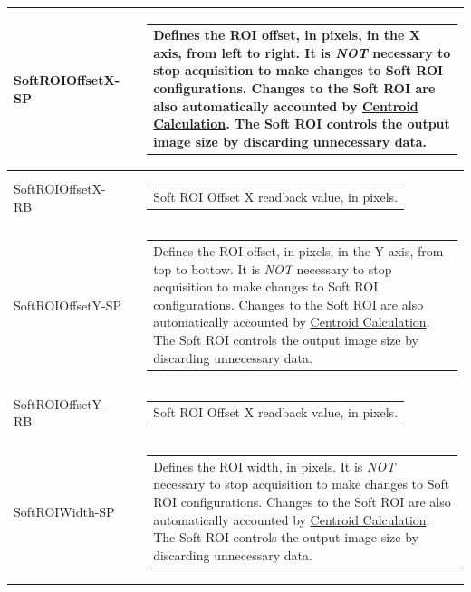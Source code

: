 \documentclass[openany]{article}
\begin{document}
\begin{longtable}{| m{3.0cm} m{4.5cm} m{7.0cm} |}
        SoftROIOffsetX-SP &  & \begin{tabular}{@{}m{6cm}@{}}
                Defines the ROI offset, in pixels, in the X axis, from left to right.
                It is \emph{NOT} necessary to stop acquisition to make changes to Soft ROI 
                configurations. Changes to the Soft ROI are also automatically accounted by
                \hyperref[sec:centroid-calc]{Centroid Calculation}.
                The Soft ROI controls the output image size by discarding unnecessary data.
            \end{tabular} \\ \hline
        SoftROIOffsetX-RB &  & \begin{tabular}{@{}m{6cm}@{}}
                Soft ROI Offset X readback value, in pixels.
            \end{tabular} \hypertarget{pv:soft-roi-off-y}{}\\ \hline
        SoftROIOffsetY-SP &  & \begin{tabular}{@{}m{6cm}@{}}
                Defines the ROI offset, in pixels, in the Y axis, from top to bottow.
                It is \emph{NOT} necessary to stop acquisition to make changes to Soft ROI 
                configurations. Changes to the Soft ROI are also automatically accounted by
                \hyperref[sec:centroid-calc]{Centroid Calculation}.
                The Soft ROI controls the output image size by discarding unnecessary data.
            \end{tabular} \\ \hline
        SoftROIOffsetY-RB &  & \begin{tabular}{@{}m{6cm}@{}}
                Soft ROI Offset X readback value, in pixels.
            \end{tabular} \hypertarget{pv:soft-roi-width}{}\\ \hline
        SoftROIWidth-SP &  & \begin{tabular}{@{}m{6cm}@{}}
                Defines the ROI width, in pixels. It is \emph{NOT} necessary to stop
                acquisition to make changes to Soft ROI configurations. Changes to the
                Soft ROI are also automatically accounted by 
                \hyperref[sec:centroid-calc]{Centroid Calculation}.
                The Soft ROI controls the output image size by discarding unnecessary data.
            \end{tabular} \\ \hline

\end{longtable}
\end{document}
